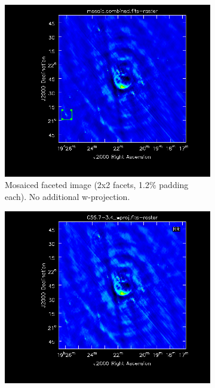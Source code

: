 \begin{figure}[h!]
  \centering
 \begin{subfigure}[b]{0.49\textwidth}
    \centering
    \includegraphics[width=\textwidth]{images/validation/mosaic.png}
    \caption{Mosaiced faceted image (2x2 facets, 1.2\% padding each). No additional w-projection.}
 \end{subfigure}
 \begin{subfigure}[b]{0.49\textwidth}
    \centering
    \includegraphics[width=\textwidth]{images/validation/wproj.png}

\end{subfigure}
\end{figure}
